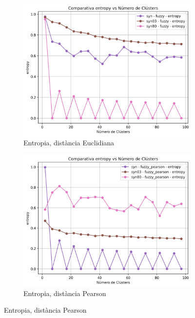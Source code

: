 \documentclass[a4paper,12pt]{report}
\begin{document}
\begin{figure}[H]
    \vspace{1em}

    \begin{subfigure}[b]{0.49\textwidth}
        \includegraphics[width=\textwidth]{Figuras/entropy-fuzzy-sin.png}
        \caption{Entropia, distància Euclidiana}
        \label{fig:fuzzy-clustering-sin-results-e}
    \end{subfigure}
    \hfill
    \begin{subfigure}[b]{0.49\textwidth}
        \includegraphics[width=\textwidth]{Figuras/entropy-fuzzy_pearson-sin.png}
        \caption{Entropia, distància Pearson}
        \label{fig:fuzzy-clustering-sin-results-f}
    \end{subfigure}


\end{figure}
\end{document}
